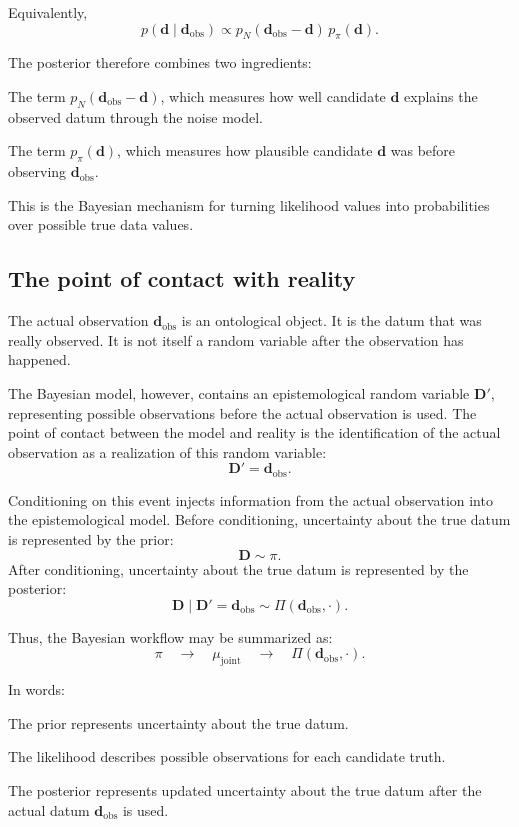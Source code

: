 \documentclass[11pt]{article}
\newcommand{\prior}{\pi}
\newcommand{\Drand}{\mathbf D}
\newcommand{\Dobsrand}{\mathbf D'}
\newcommand{\dobs}{\mathbf d_{\mathrm{obs}}}
\begin{document}
Equivalently,
\[
    p(\mathbf d\mid \dobs)
    \propto
    p_N(\dobs-\mathbf d)\,p_{\prior}(\mathbf d).
\]

The posterior therefore combines two ingredients:
\begin{description}[leftmargin=2.8cm,style=nextline]
    \item[Data fit.]
    The term \(p_N(\dobs-\mathbf d)\), which measures how well candidate \(\mathbf d\) explains the observed datum through the noise model.

    \item[Prior weight.]
    The term \(p_{\prior}(\mathbf d)\), which measures how plausible candidate \(\mathbf d\) was before observing \(\dobs\).
\end{description}

This is the Bayesian mechanism for turning likelihood values into probabilities over possible true data values.

\subsection{The point of contact with reality}

The actual observation \(\dobs\) is an ontological object. It is the datum that was really observed. It is not itself a random variable after the observation has happened.

The Bayesian model, however, contains an epistemological random variable \(\Dobsrand\), representing possible observations before the actual observation is used. The point of contact between the model and reality is the identification of the actual observation as a realization of this random variable:
\[
    \Dobsrand=\dobs.
\]

Conditioning on this event injects information from the actual observation into the epistemological model. Before conditioning, uncertainty about the true datum is represented by the prior:
\[
    \Drand\sim\prior.
\]
After conditioning, uncertainty about the true datum is represented by the posterior:
\[
    \Drand\mid \Dobsrand=\dobs
    \sim
    \Pi(\dobs,\cdot).
\]

Thus, the Bayesian workflow may be summarized as:
\[
    \prior
    \quad
    \longrightarrow
    \quad
    \mu_{\mathrm{joint}}
    \quad
    \longrightarrow
    \quad
    \Pi(\dobs,\cdot).
\]

In words:
\begin{description}[leftmargin=2.8cm,style=nextline]
    \item[Before observation.]
    The prior represents uncertainty about the true datum.

    \item[Observation model.]
    The likelihood describes possible observations for each candidate truth.

    \item[After observation.]
    The posterior represents updated uncertainty about the true datum after the actual datum \(\dobs\) is used.
\end{description}
\end{document}
